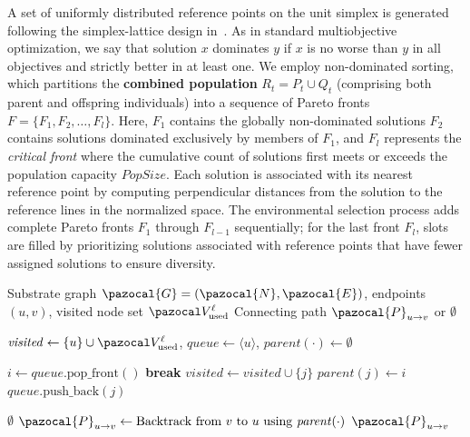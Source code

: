 \documentclass[a4paper,fleqn]{cas-sc}
\begin{document}
A set of uniformly distributed reference points on the unit simplex is generated following the simplex-lattice design in~\cite{deb2014nsga3}.
As in standard multiobjective optimization, we say that solution $x$ dominates $y$ if $x$ is no worse than $y$ in all objectives and strictly better in at least one. We employ non-dominated sorting, which partitions the \textbf{combined population} $R_t = P_t \cup Q_t$ (comprising both parent and offspring individuals) into a sequence of Pareto fronts $F = \{F_1, F_2, \dots, F_l\}$.
Here, $F_1$ contains the globally non-dominated solutions
$F_2$ contains solutions dominated exclusively by members of $F_1$, and $F_l$ represents the \textit{critical front} where the cumulative count of solutions first meets or exceeds the population capacity $\textit{PopSize}$.
%
Each solution is associated with its nearest reference point by computing perpendicular distances from the solution to the reference lines in the normalized space. 
The environmental selection process adds complete Pareto fronts $F_1$ through $F_{l-1}$ sequentially; for the last front $F_l$, slots are filled by prioritizing solutions associated with reference points that have fewer assigned solutions to ensure diversity.


\begin{algorithm}[htbp]
\small
\caption{Feasibility-Oriented Path Completion for Line Repair}
\label{alg:bfs_repair}
\begin{algorithmic}[1]
    \renewcommand{\algorithmicrequire}{\textbf{Input:}}
    \renewcommand{\algorithmicensure}{\textbf{Output:}}
    
    \REQUIRE Substrate graph $\pazocal{G}=(\pazocal{N}, \pazocal{E})$, endpoints $(u, v)$, visited node set $\pazocal V_{\mathrm{used}}^\ell$
    \ENSURE Connecting path $\pazocal{P}_{u \to v}$ or $\emptyset$
    
    \STATE $\mathit{visited} \gets \{u\} \cup \pazocal V_{\mathrm{used}}^\ell$, $\mathit{queue} \gets \langle u \rangle$, $\mathit{parent}(\cdot) \gets \emptyset$
    
        \STATE $i \gets \mathit{queue}.\text{pop\_front}()$
            \STATE \textbf{break}
        \ENDIF
                \STATE $\mathit{visited} \gets \mathit{visited} \cup \{j\}$
                \STATE $\mathit{parent}(j) \gets i$
                \STATE $\mathit{queue}.\text{push\_back}(j)$
            \ENDIF
        \ENDFOR
    \ENDWHILE
    
        \RETURN $\emptyset$
    \ENDIF
    \STATE $\pazocal{P}_{u \to v} \gets \text{Backtrack from } v \text{ to } u \text{ using } \mathit{parent}(\cdot)$
    \RETURN $\pazocal{P}_{u \to v}$
\end{algorithmic}
\end{algorithm}
\end{document}
